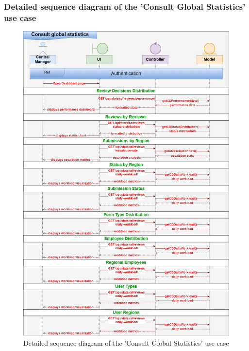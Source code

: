 \subsubsection{Detailed sequence diagram of the 'Consult Global Statistics' use case}
\begin{figure}[h!]
    \centering
    \includegraphics[width=1\textwidth]{figures/det consult global statistics.png}
    \caption{Detailed sequence diagram of the 'Consult Global Statistics' use case}
\end{figure}

